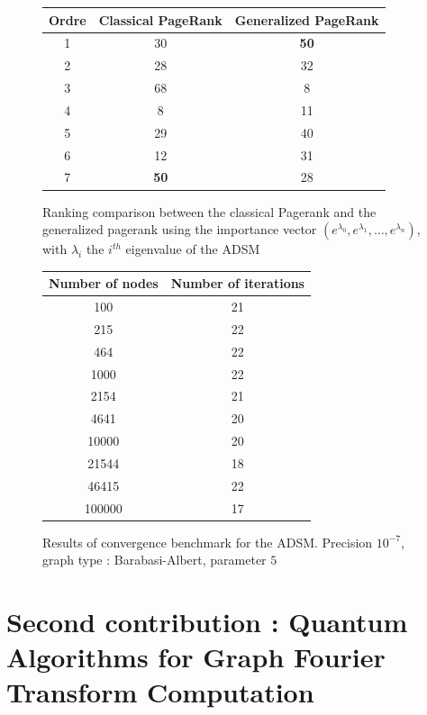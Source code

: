 \documentclass{article}
\begin{document}
\begin{figure}[h!]
    \centering
    
\begin{tabular}{c|c|c}
    \textbf{Ordre} & \textbf{Classical PageRank} & \textbf{Generalized PageRank} \\
    \hline
        1 & 30 & \textbf{50} \\
    2 & 28 & 32\\
    3 & 68 & 8\\
    4 & 8 & 11\\
    5 & 29 & 40 \\
    6 & 12 & 31\\
    7 & \textbf{50} & 28\\
    \hline
    
\end{tabular}

    \caption{Ranking comparison between the classical Pagerank and the generalized pagerank using the importance vector $(e^{\lambda_0}, e^{\lambda_1}, \hdots, e^{\lambda_n})$, with $\lambda_i$ the $i^{th}$ eigenvalue of the ADSM}
    \label{fig:ranking2}
\end{figure}

\begin{figure}
    \centering
    \begin{tabular}{c|c}
        \textbf{Number of nodes} & \textbf{Number of iterations}\\
        \hline
        100 & 21 \\
        215 & 22 \\
464 & 22 \\
1000 & 22 \\
2154 & 21 \\
4641 & 20 \\
10000 & 20 \\
21544 & 18 \\
46415 & 22 \\
100000 & 17
    \end{tabular}
    \caption{Results of convergence benchmark for the ADSM. Precision $10^{-7}$, graph type : Barabasi-Albert, parameter $5$}
    \label{fig:benchmark}
\end{figure}

\newpage
\section{Second contribution : Quantum Algorithms for Graph Fourier Transform Computation}
\label{sec:quantumPagerank}
\end{document}
